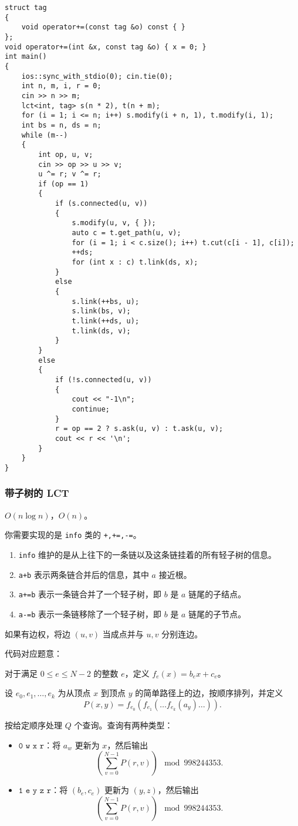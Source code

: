\documentclass[12pt]{ctexart}
\begin{document}
\begin{lstlisting}
struct tag
{
	void operator+=(const tag &o) const { }
};
void operator+=(int &x, const tag &o) { x = 0; }
int main()
{
	ios::sync_with_stdio(0); cin.tie(0);
	int n, m, i, r = 0;
	cin >> n >> m;
	lct<int, tag> s(n * 2), t(n + m);
	for (i = 1; i <= n; i++) s.modify(i + n, 1), t.modify(i, 1);
	int bs = n, ds = n;
	while (m--)
	{
		int op, u, v;
		cin >> op >> u >> v;
		u ^= r; v ^= r;
		if (op == 1)
		{
			if (s.connected(u, v))
			{
				s.modify(u, v, { });
				auto c = t.get_path(u, v);
				for (i = 1; i < c.size(); i++) t.cut(c[i - 1], c[i]);
				++ds;
				for (int x : c) t.link(ds, x);
			}
			else
			{
				s.link(++bs, u);
				s.link(bs, v);
				t.link(++ds, u);
				t.link(ds, v);
			}
		}
		else
		{
			if (!s.connected(u, v))
			{
				cout << "-1\n";
				continue;
			}
			r = op == 2 ? s.ask(u, v) : t.ask(u, v);
			cout << r << '\n';
		}
	}
}
\end{lstlisting}


\subsubsection{带子树的 LCT}

$O(n\log n)$，$O(n)$。

你需要实现的是 \verb|info| 类的 \verb|+,+=,-=|。

\begin{enumerate}
	\item \verb|info| 维护的是从上往下的一条链以及这条链挂着的所有轻子树的信息。
	\item \verb|a+b| 表示两条链合并后的信息，其中 $a$ 接近根。
	\item \verb|a+=b| 表示一条链合并了一个轻子树，即 $b$ 是 $a$ 链尾的子结点。
	\item \verb|a-=b| 表示一条链移除了一个轻子树，即 $b$ 是 $a$ 链尾的子节点。
\end{enumerate}

如果有边权，将边 $(u,v)$ 当成点并与 $u,v$ 分别连边。

代码对应题意：

对于满足 $0 \leq e \leq N - 2$ 的整数 $e$，定义 $f_e(x) = b_e x + c_e$。

设 $e_0, e_1, \ldots, e_k$ 为从顶点 $x$ 到顶点 $y$ 的简单路径上的边，按顺序排列，并定义
\[
	P(x, y) = f_{e_0}(f_{e_1}(\ldots f_{e_k}(a_y) \ldots)).
\]

按给定顺序处理 $Q$ 个查询。查询有两种类型：

\begin{itemize}
	\item $\texttt{0 w x r}$：将 $a_w$ 更新为 $x$，然后输出
	      \[
		      \left( \sum_{v=0}^{N-1} P(r, v) \right) \mod 998244353.
	      \]
	\item $\texttt{1 e y z r}$：将 $(b_e, c_e)$ 更新为 $(y, z)$，然后输出
	      \[
		      \left( \sum_{v=0}^{N-1} P(r, v) \right) \mod 998244353.
	      \]
\end{itemize}
\end{document}

